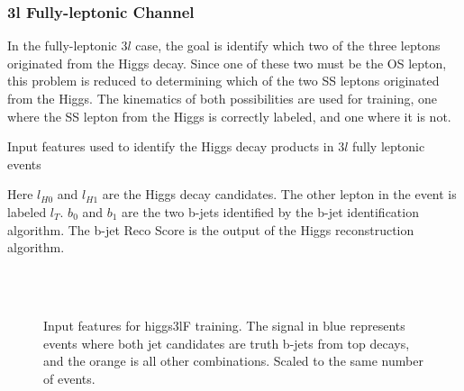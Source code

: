 \subsubsection{3l Fully-leptonic Channel}
\label{subsec:higgs3lF}

In the fully-leptonic $3l$  case, the goal is identify which two of the three leptons originated from the Higgs decay. Since one of these two must be the OS lepton, this problem is reduced to determining which of the two SS leptons originated from the Higgs. The kinematics of both possibilities are used for training, one where the SS lepton from the Higgs is correctly labeled, and one where it is not.

\begin{table}[H]

  \caption{Input features used to identify the Higgs decay products in $3l$  fully leptonic events}
  \label{tab:higgsTop3lFfeatures}
\end{table}

Here $l_{H0}$ and $l_{H1}$ are the Higgs decay candidates. The other lepton in the event is labeled $l_T$. $b_0$ and $b_1$ are the two b-jets identified by the b-jet identification algorithm. The b-jet Reco Score is the output of the Higgs reconstruction algorithm. 

\begin{figure}[H]
    \centering
    \\
    \\
    \caption{Input features for higgs3lF training. The signal in blue represents events where both jet candidates are truth b-jets from top decays, and the orange is all other combinations. Scaled to the same number of events.}
    \label{fig:features_higgs3lF}
\end{figure}


